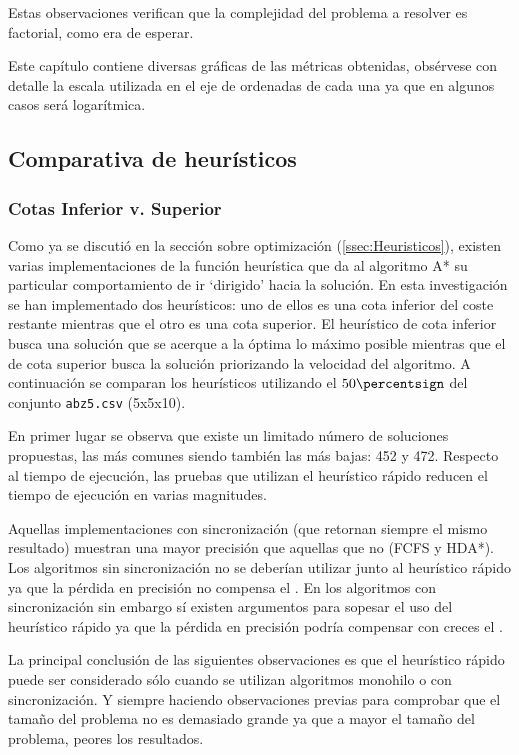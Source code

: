 Estas observaciones verifican que la complejidad del problema
a resolver es factorial, como era de esperar.

\begin{notebox}
    Este capítulo contiene diversas gráficas de las métricas obtenidas,
    obsérvese con detalle la escala utilizada en el eje de ordenadas de cada una
    ya que en algunos casos será logarítmica.
\end{notebox}

\subsection{Comparativa de heurísticos}

\subsubsection{Cotas Inferior v. Superior}

Como ya se discutió en la sección sobre optimización (\ref{ssec:Heuristicos}),
existen varias implementaciones de la función heurística que da al algoritmo
A* su particular comportamiento de ir `dirigido' hacia la solución.
En esta investigación se han implementado dos heurísticos:
uno de ellos es una cota inferior del coste restante mientras que
el otro es una cota superior.
El heurístico de cota inferior busca una solución que se acerque a la óptima lo máximo posible
mientras que el de cota superior busca la solución priorizando la velocidad del algoritmo.
A continuación se comparan los heurísticos utilizando el
$50\percentsign$ del conjunto \lstinline{abz5.csv} (5x5x10).

En primer lugar se observa que existe un limitado número de soluciones
propuestas, las más comunes siendo también las más bajas: 452 y 472.
Respecto al tiempo de ejecución, las pruebas que utilizan el heurístico rápido
reducen el tiempo de ejecución en varias magnitudes.

Aquellas implementaciones con sincronización (que retornan siempre el mismo resultado)
muestran una mayor precisión que aquellas que no (FCFS y HDA*).
Los algoritmos sin sincronización no se deberían utilizar junto
al heurístico rápido ya que la pérdida en precisión no
compensa el .
En los algoritmos con sincronización sin embargo sí existen
argumentos para sopesar el uso del heurístico rápido ya que
la pérdida en precisión podría compensar con creces
el .

\begin{keynotebox}
    La principal conclusión de las siguientes observaciones es que
    el heurístico rápido puede ser considerado sólo cuando
    se utilizan algoritmos monohilo o
    con sincronización.
    Y siempre haciendo observaciones previas
    para comprobar que el tamaño del problema no es demasiado grande
    ya que a mayor el tamaño del problema, peores los resultados.
\end{keynotebox}

